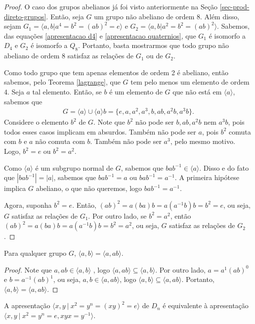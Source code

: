 	\begin{proof}
		O caso dos grupos abelianos já foi visto anteriormente na Seção \ref{sec-prod-direto-grupos}. 
		Então, seja $G$ um grupo não abeliano de ordem 8. Além disso, sejam 
		$G_1 = \langle a,b | a^4 = b^2 =(ab)^2 = e \rangle$ e $G_2 = \langle a,b | a^2 = b^2 = (ab)^2 \rangle$.
		Sabemos, das equações \eqref{apresentacao d4} e \eqref{apresentacao quaternios}, que $G_1$ 
		é isomorfo a $D_4$ e $G_2$ é isomorfo a $Q_8$. Portanto, basta mostrarmos que todo grupo não abeliano 
		de ordem 8 satisfaz as relações de $G_1$ ou de $G_2$. 
		
		\par\vspace{0.3cm} Como todo grupo que tem apenas elementos de ordem 2 é abeliano,
		então sabemos, pelo Teorema \ref{lagrange}, que $G$ tem pelo menos um elemento de ordem 4. 
		Seja $a$ tal elemento. Então, se $b$ é um elemento de $G$ que não está em $\langle a \rangle$, 
		sabemos que 
		\begin{align*}
		    G = \langle a \rangle\cup\langle a \rangle b = \{e, a, a^2, a^3, b, ab, a^2b, a^3b\}.
		\end{align*}
		Considere o elemento $b^2$ de $G$. Note que $b^2$ não pode ser $b, ab, a^2b$ 
		nem $a^3b$, pois todos esses casos implicam em absurdos. Também não pode ser $a$, pois $b^2$ 
		comuta com $b$ e $a$ não comuta com $b$. Também não pode ser $a^3$, pelo mesmo motivo. 
		Logo, $b^2 = e$ ou $b^2 = a^2$. 
		
		\par\vspace{0.3cm} Como $\langle a \rangle$ é um subgrupo normal de $G$, sabemos que 
		$bab^{-1}\in\langle a \rangle$. Disso e do fato que $|bab^{-1}| = |a|$, sabemos que $bab^{-1} = a$ 
		ou $bab^{-1} = a^{-1}$. A primeira hipótese implica $G$ abeliano, o que não queremos, 
		logo $bab^{-1} = a^{-1}$.
		
		\par\vspace{0.3cm} Agora, suponha $b^2 = e$. Então, $(ab)^2 = a(ba)b = a(a^{-1}b)b = b^2 = e$, 
		ou seja, $G$ satisfaz as relações de $G_1$. Por outro lado, se $b^2 = a^2$, então 
		$(ab)^2 = a(ba)b = a(a^{-1}b)b = b^2 = a^2$, ou seja, $G$ satisfaz as relações de $G_2$.
	\end{proof}
	\begin{lemma}
	\label{lema geradores}
		Para qualquer grupo $G$, $\langle a,b \rangle = \langle a,ab \rangle$.
	\end{lemma}
	\begin{proof}
		Note que $a,ab\in\langle a,b \rangle$ , logo $\langle a,ab \rangle\subseteq \langle a,b \rangle$. 
		Por outro lado, $a=a^1(ab)^0$ e $b=a^{-1}(ab)^1$, ou seja, $a,b\in\langle a,ab \rangle$, 
		logo $\langle a,b \rangle \subseteq \langle a,ab \rangle$. Portanto, 
		$\langle a,b \rangle = \langle a,ab \rangle$.
	\end{proof}
	\begin{lemma}
	\label{lema diedral}
		A apresentação  $\langle x,y \ | \ x^2=y^n=(xy)^2=e \rangle$ de $D_n$ é equivalente à apresentação 
		$\langle x,y \ | \ x^2=y^n=e,xyx=y^{-1} \rangle$.
	\end{lemma}
	
